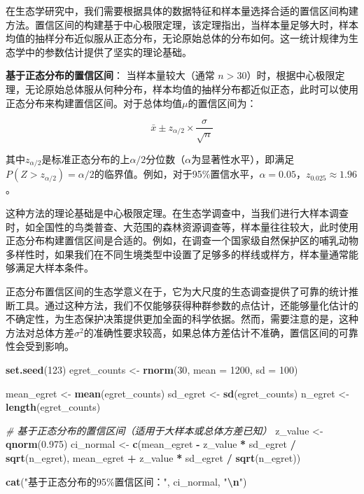 \documentclass[
  twoside,12pt,fontset=none]{ctexbook}
\newenvironment{Shaded}{\begin{snugshade}}{\end{snugshade}}
\newcommand{\AttributeTok}[1]{\textcolor[rgb]{0.13,0.29,0.53}{#1}}
\newcommand{\CommentTok}[1]{\textcolor[rgb]{0.56,0.35,0.01}{\textit{#1}}}
\newcommand{\DecValTok}[1]{\textcolor[rgb]{0.00,0.00,0.81}{#1}}
\newcommand{\FloatTok}[1]{\textcolor[rgb]{0.00,0.00,0.81}{#1}}
\newcommand{\FunctionTok}[1]{\textcolor[rgb]{0.13,0.29,0.53}{\textbf{#1}}}
\newcommand{\NormalTok}[1]{#1}
\newcommand{\OtherTok}[1]{\textcolor[rgb]{0.56,0.35,0.01}{#1}}
\newcommand{\SpecialCharTok}[1]{\textcolor[rgb]{0.81,0.36,0.00}{\textbf{#1}}}
\newcommand{\StringTok}[1]{\textcolor[rgb]{0.31,0.60,0.02}{#1}}
\begin{document}
在生态学研究中，我们需要根据具体的数据特征和样本量选择合适的置信区间构建方法。置信区间的构建基于中心极限定理，该定理指出，当样本量足够大时，样本均值的抽样分布近似服从正态分布，无论原始总体的分布如何。这一统计规律为生态学中的参数估计提供了坚实的理论基础。

\textbf{基于正态分布的置信区间}：
当样本量较大（通常 \(n > 30\)）时，根据中心极限定理，无论原始总体服从何种分布，样本均值的抽样分布都近似正态，此时可以使用正态分布来构建置信区间。对于总体均值\(\mu\)的置信区间为：

\[\bar{x} \pm z_{\alpha/2} \times \frac{\sigma}{\sqrt{n}}\]

其中\(z_{\alpha/2}\)是标准正态分布的上\(\alpha/2\)分位数（\(\alpha\)为显著性水平），即满足\(P(Z > z_{\alpha/2}) = \alpha/2\)的临界值。例如，对于95\%置信水平，\(\alpha = 0.05\)，\(z_{0.025} \approx 1.96\)。

这种方法的理论基础是中心极限定理。在生态学调查中，当我们进行大样本调查时，如全国性的鸟类普查、大范围的森林资源调查等，样本量往往较大，此时使用正态分布构建置信区间是合适的。例如，在调查一个国家级自然保护区的哺乳动物多样性时，如果我们在不同生境类型中设置了足够多的样线或样方，样本量通常能够满足大样本条件。

正态分布置信区间的生态学意义在于，它为大尺度的生态调查提供了可靠的统计推断工具。通过这种方法，我们不仅能够获得种群参数的点估计，还能够量化估计的不确定性，为生态保护决策提供更加全面的科学依据。然而，需要注意的是，这种方法对总体方差\(\sigma^2\)的准确性要求较高，如果总体方差估计不准确，置信区间的可靠性会受到影响。

\begin{Shaded}
\begin{Highlighting}[]
\FunctionTok{set.seed}\NormalTok{(}\DecValTok{123}\NormalTok{)}
\NormalTok{egret\_counts }\OtherTok{\textless{}{-}} \FunctionTok{rnorm}\NormalTok{(}\DecValTok{30}\NormalTok{, }\AttributeTok{mean =} \DecValTok{1200}\NormalTok{, }\AttributeTok{sd =} \DecValTok{100}\NormalTok{)}

\NormalTok{mean\_egret }\OtherTok{\textless{}{-}} \FunctionTok{mean}\NormalTok{(egret\_counts)}
\NormalTok{sd\_egret }\OtherTok{\textless{}{-}} \FunctionTok{sd}\NormalTok{(egret\_counts)}
\NormalTok{n\_egret }\OtherTok{\textless{}{-}} \FunctionTok{length}\NormalTok{(egret\_counts)}

\CommentTok{\# 基于正态分布的置信区间（适用于大样本或总体方差已知）}
\NormalTok{z\_value }\OtherTok{\textless{}{-}} \FunctionTok{qnorm}\NormalTok{(}\FloatTok{0.975}\NormalTok{)}
\NormalTok{ci\_normal }\OtherTok{\textless{}{-}} \FunctionTok{c}\NormalTok{(mean\_egret }\SpecialCharTok{{-}}\NormalTok{ z\_value }\SpecialCharTok{*}\NormalTok{ sd\_egret }\SpecialCharTok{/} \FunctionTok{sqrt}\NormalTok{(n\_egret),}
\NormalTok{               mean\_egret }\SpecialCharTok{+}\NormalTok{ z\_value }\SpecialCharTok{*}\NormalTok{ sd\_egret }\SpecialCharTok{/} \FunctionTok{sqrt}\NormalTok{(n\_egret))}

\FunctionTok{cat}\NormalTok{(}\StringTok{"基于正态分布的95\%置信区间："}\NormalTok{, ci\_normal, }\StringTok{"}\SpecialCharTok{\textbackslash{}n}\StringTok{"}\NormalTok{)}
\end{Highlighting}
\end{Shaded}
\end{document}
